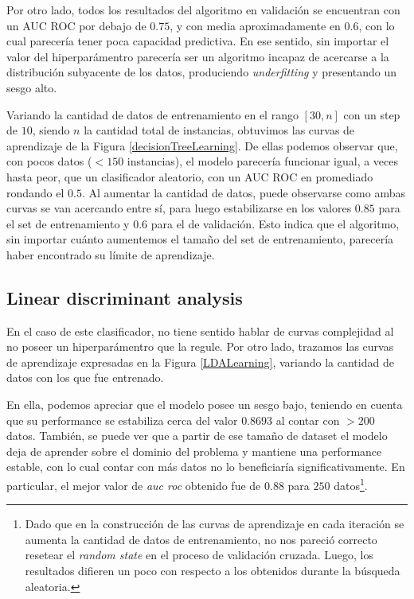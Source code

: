 Por otro lado, todos los resultados del algoritmo en validación se encuentran con un AUC ROC por debajo de $0.75$, y con media aproximadamente en $0.6$, con lo cual parecería tener poca capacidad predictiva. En ese sentido, sin importar el valor del hiperparámentro parecería ser un algoritmo incapaz de acercarse a la distribución subyacente de los datos, produciendo \textit{underfitting} y presentando un sesgo alto.


Variando la cantidad de datos de entrenamiento en el rango $[30, n]$ con un step de $10$, siendo $n$ la cantidad total de instancias, obtuvimos las curvas de aprendizaje de la Figura \ref{decisionTreeLearning}. De ellas podemos observar que, con pocos datos ($< 150$ instancias), el modelo parecería funcionar igual, a veces hasta peor, que un clasificador aleatorio, con un AUC ROC en promediado rondando el $0.5$. Al aumentar la cantidad de datos, puede observarse como ambas curvas se van acercando entre sí, para luego estabilizarse en los valores $0.85$ para el set de entrenamiento y $0.6$ para el de validación. Esto indica que el algoritmo, sin importar cuánto aumentemos el tamaño del set de entrenamiento, parecería haber encontrado su límite de aprendizaje.

\subsection{Linear discriminant analysis}

En el caso de este clasificador, no tiene sentido hablar de curvas complejidad al no poseer un hiperparámentro que la regule. Por otro lado, trazamos las curvas de aprendizaje expresadas en la Figura \ref{LDALearning}, variando la cantidad de datos con los que fue entrenado. 

En ella, podemos apreciar que el modelo posee un sesgo bajo, teniendo en cuenta que su performance se estabiliza cerca del valor $0.8693$ al contar con $> 200$ datos. También, se puede ver que a partir de ese tamaño de dataset el modelo deja de aprender sobre el dominio del problema y mantiene una performance estable, con lo cual contar con más datos no lo beneficiaría significativamente. En particular, el mejor valor de \textit{auc roc} obtenido fue de $0.88$ para $250$ datos\footnote{Dado que en la construcción de las curvas de aprendizaje en cada iteración se aumenta la cantidad de datos de entrenamiento, no nos pareció correcto resetear el \textit{random state} en el proceso de validación cruzada. Luego, los resultados difieren un poco con respecto a los obtenidos durante la búsqueda aleatoria.}.

